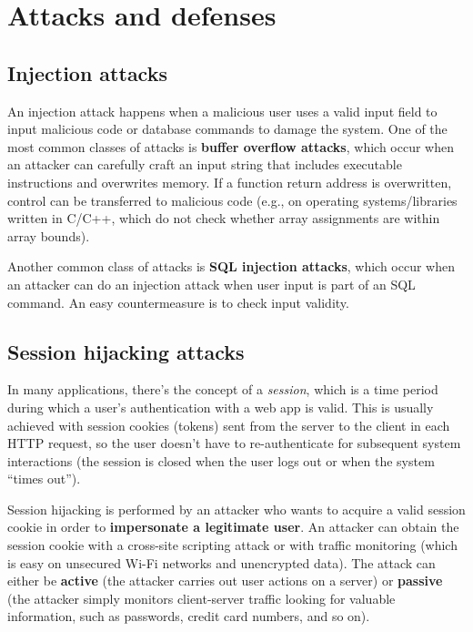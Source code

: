 \section{Attacks and defenses}

\subsection{Injection attacks}

An injection attack happens when a malicious user uses a valid input field to input malicious code or database commands to damage the system. One of the most common classes of attacks is \textbf{buffer overflow attacks}, which occur when an attacker can carefully craft an input string that includes executable instructions and overwrites memory. If a function return address is overwritten, control can be transferred to malicious code (e.g., on operating systems/libraries written in C/C++, which do not check whether array assignments are within array bounds).

Another common class of attacks is \textbf{SQL injection attacks}, which occur when an attacker can do an injection attack when user input is part of an SQL command. An easy countermeasure is to check input validity.

\subsection{Session hijacking attacks}

In many applications, there's the concept of a \textit{session}, which is a time period during which a user’s authentication with a web app is valid. This is usually achieved with session cookies (tokens) sent from the server to the client in each HTTP request, so the user doesn’t have to re-authenticate for subsequent system interactions (the session is closed when the user logs out or when the system “times out”).

Session hijacking is performed by an attacker who wants to acquire a valid session cookie in order to \textbf{impersonate a legitimate user}. An attacker can obtain the session cookie with a cross-site scripting attack or with traffic monitoring (which is easy on unsecured Wi-Fi networks and unencrypted data). The attack can either be \textbf{active} (the attacker carries out user actions on a server) or \textbf{passive} (the attacker simply monitors client-server traffic looking for valuable information, such as passwords, credit card numbers, and so on).

